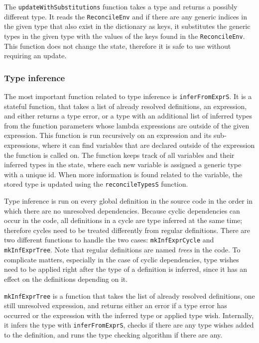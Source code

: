\documentclass[12pt]{article}
\begin{document}
The \verb$updateWithSubstitutions$ function takes a type and returns a possibly
different type. It reads the \verb$ReconcileEnv$ and if there are any generic
indices in the given type that also exist in the dictionary as keys, it
substitutes the generic types in the given type with the values of the keys
found in the \verb$ReconcileEnv$. This function does not change the state,
therefore it is safe to use without requiring an update.

\subsubsection{Type inference}

The most important function related to type inference is \verb$inferFromExprS$.
It is a stateful function, that takes a list of already resolved definitions,
an expression, and either returns a type error, or a type with an additional
list of inferred types from the function parameters whose lambda expressions are
outside of the given expression. This function is run recursively on an
expression and its sub-expressions, where it can find variables that are
declared outside of the expression the function is called on. The function keeps
track of all variables and their inferred types in the state, where each new
variable is assigned a generic type with a unique id. When more information is
found related to the variable, the stored type is updated using the
\verb$reconcileTypesS$ function.

Type inference is run on every global definition in the source code in the order
in which there are no unresolved dependencies. Because cyclic dependencies can
occur in the code, all definitions in a cycle are type inferred at the same
time; therefore cycles need to be treated differently from regular definitions.
There are two different functions to handle the two cases: \verb$mkInfExprCycle$
and \verb$mkInfExprTree$. Note that regular definitions are named \emph{trees}
in the code. To complicate matters, especially in the case of cyclic
dependencies, type wishes need to be applied right after the type of a
definition is inferred, since it has an effect on the definitions depending on
it.

\verb$mkInfExprTree$ is a function that takes the list of already resolved
definitions, one still unresolved expression, and returns either an error if a
type error has occurred or the expression with the inferred type or applied type
wish. Internally, it infers the type with \verb$inferFromExprS$, checks if there
are any type wishes added to the definition, and runs the type checking
algorithm if there are any.
\end{document}
